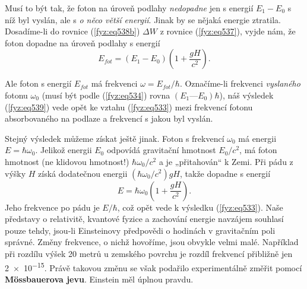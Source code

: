 {    Musí to být tak, že foton na úroveň podlahy \emph{nedopadne} jen s energií \(E_1 - E_0\) s níž 
    byl vyslán, ale s \emph{o něco větší energií}. Jinak by se nějaká energie ztratila. Dosadíme-li 
    do rovnice (\ref{fyz:eq538b}) \(\Delta W\) z rovnice (\ref{fyz:eq537}), vyjde nám, že foton 
    dopadne na úroveň podlahy s energií
    \begin{equation}\label{fyz:eq539}
      E_{fot} = (E_1-E_0)\left(1 + \dfrac{gH}{c^2}\right).
    \end{equation}
    
    Ale foton s energií \(E_{fot}\) má frekvenci \(\omega = E_{fot}/\hbar\). Označíme-li frekvenci 
    \emph{vyslaného} fotonu \(\omega_0\) (musí být podle (\ref{fyz:eq534}) rovna \((E_1 — 
    E_0)\hbar\)), náš výsledek (\ref{fyz:eq539}) vede opět ke vztahu (\ref{fyz:eq533}) mezi 
    frekvencí fotonu absorbovaného na podlaze a frekvencí s jakou byl vyslán.
    
    Stejný výsledek můžeme získat ještě jinak. Foton s frekvencí \(\omega_0\) má energii \(E = 
    \hbar\omega_0\). Jelikož energii \(E_0\) odpovídá gravitační hmotnost \(E_0/c^2\), má foton 
    hmotnost (ne klidovou hmotnost!) \(\hbar\omega_0/c^2\) a je „přitahován“ k Zemi. Při pádu z 
    výšky \(H\) získá  dodatečnou energii \((\hbar\omega_0/c^2)gH\), takže dopadne s energií
    \begin{equation*}
      E = \hbar\omega_0\left(1 + \dfrac{gH}{c^2}\right).
    \end{equation*}
    Jeho frekvence po pádu je \(E/\hbar\), což opět vede k výsledku (\ref{fyz:eq533}). Naše 
    představy o relativitě, kvantové fyzice a zachování energie navzájem souhlasí pouze tehdy, 
    jsou-li Einsteinovy předpovědi o hodinách v gravitačním poli správné. Změny frekvence, o nichž 
    hovoříme, jsou obvykle velmi malé. Například při rozdílu výšek \num{20} metrů u zemského 
    povrchu je rozdíl frekvencí přibližně jen \num{2e-15}. Právě takovou změnu se však podařilo 
    experimentálně změřit pomocí \textbf{Mössbauerova jevu}. Einstein měl úplnou pravdu.
    
}
